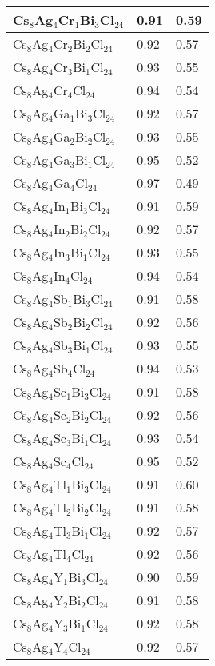 \documentclass[journal=jpclcd,manuscript=letter]{achemso}
\begin{document}
\begin{longtable}{p{4.2cm} p{2.0cm}p{2.0cm}}
		Cs$_8$Ag$_4$Cr$_1$Bi$_3$Cl$_{24}$&0.91 &0.59\\ \hline
		Cs$_8$Ag$_4$Cr$_2$Bi$_2$Cl$_{24}$&0.92 &0.57\\ \hline
		Cs$_8$Ag$_4$Cr$_3$Bi$_1$Cl$_{24}$&0.93 &0.55\\ \hline
		Cs$_8$Ag$_4$Cr$_4$Cl$_{24}$&0.94 &0.54\\ \hline
		Cs$_8$Ag$_4$Ga$_1$Bi$_3$Cl$_{24}$&0.92 &0.57\\ \hline
		Cs$_8$Ag$_4$Ga$_2$Bi$_2$Cl$_{24}$&0.93 &0.55\\ \hline
		Cs$_8$Ag$_4$Ga$_3$Bi$_1$Cl$_{24}$&0.95 &0.52\\ \hline
		Cs$_8$Ag$_4$Ga$_4$Cl$_{24}$&0.97 &0.49\\ \hline
		Cs$_8$Ag$_4$In$_1$Bi$_3$Cl$_{24}$&0.91 &0.59\\ \hline
		Cs$_8$Ag$_4$In$_2$Bi$_2$Cl$_{24}$&0.92 &0.57\\ \hline
		Cs$_8$Ag$_4$In$_3$Bi$_1$Cl$_{24}$&0.93 &0.55\\ \hline
		Cs$_8$Ag$_4$In$_4$Cl$_{24}$&0.94 & 0.54\\ \hline
		Cs$_8$Ag$_4$Sb$_1$Bi$_3$Cl$_{24}$&0.91 & 0.58\\ \hline
		Cs$_8$Ag$_4$Sb$_2$Bi$_2$Cl$_{24}$&0.92 &0.56\\ \hline
		Cs$_8$Ag$_4$Sb$_3$Bi$_1$Cl$_{24}$&0.93  &0.55\\ \hline
		Cs$_8$Ag$_4$Sb$_4$Cl$_{24}$&0.94 &0.53\\ \hline
		Cs$_8$Ag$_4$Sc$_1$Bi$_3$Cl$_{24}$&0.91 &0.58\\ \hline
		Cs$_8$Ag$_4$Sc$_2$Bi$_2$Cl$_{24}$&0.92 &0.56\\ \hline
		Cs$_8$Ag$_4$Sc$_3$Bi$_1$Cl$_{24}$&0.93 &0.54\\ \hline
		Cs$_8$Ag$_4$Sc$_4$Cl$_{24}$&0.95 &0.52\\ \hline
		Cs$_8$Ag$_4$Tl$_1$Bi$_3$Cl$_{24}$&0.91 &0.60\\ \hline
		Cs$_8$Ag$_4$Tl$_2$Bi$_2$Cl$_{24}$&0.91 &0.58\\ \hline
		Cs$_8$Ag$_4$Tl$_3$Bi$_1$Cl$_{24}$&0.92 &0.57\\ \hline
		Cs$_8$Ag$_4$Tl$_4$Cl$_{24}$&0.92 &0.56\\ \hline
		Cs$_8$Ag$_4$Y$_1$Bi$_3$Cl$_{24}$&0.90 &0.59\\ \hline
		Cs$_8$Ag$_4$Y$_2$Bi$_2$Cl$_{24}$&0.91 &0.58\\ \hline
		Cs$_8$Ag$_4$Y$_3$Bi$_1$Cl$_{24}$&0.92 &0.58\\ \hline
		Cs$_8$Ag$_4$Y$_4$Cl$_{24}$&0.92 &0.57\\ \hline

\end{longtable}
\end{document}

